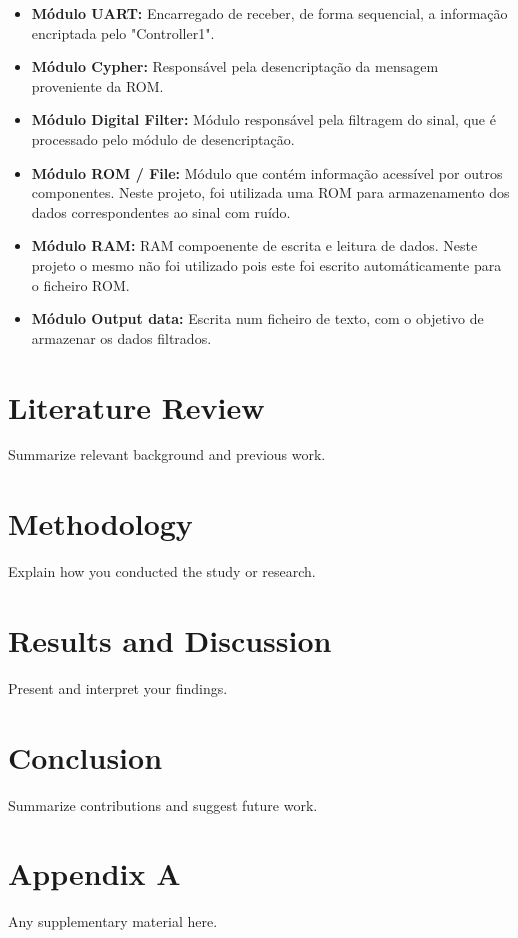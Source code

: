 \documentclass[12pt, a4paper]{article}
\begin{document}
\begin{itemize}
    \item \textbf{Módulo UART:} Encarregado de receber, de forma sequencial, a informação encriptada pelo "Controller1".

    \item \textbf{Módulo Cypher:} Responsável pela desencriptação da mensagem proveniente da ROM.
    \item \textbf{Módulo Digital Filter:} Módulo responsável pela filtragem do sinal, que é processado pelo módulo de desencriptação.\\

    \item \textbf{Módulo ROM / File:} Módulo que contém informação acessível por outros componentes.  
    Neste projeto, foi utilizada uma ROM para armazenamento dos dados correspondentes ao sinal com ruído.

    \item \textbf{Módulo RAM:} RAM compoenente de escrita e leitura de dados. Neste projeto o mesmo não foi utilizado pois este foi escrito automáticamente para o ficheiro ROM.\\

    \item \textbf{Módulo Output data:} Escrita num ficheiro de texto, com o objetivo de armazenar os dados filtrados.\\
    
\end{itemize}

\newpage

\section{Literature Review}
Summarize relevant background and previous work.
\newpage

\section{Methodology}
Explain how you conducted the study or research.
\newpage

\section{Results and Discussion}
Present and interpret your findings.
\newpage

\section{Conclusion}
Summarize contributions and suggest future work.
\newpage



\appendix
\section{Appendix A}
Any supplementary material here.
\end{document}
